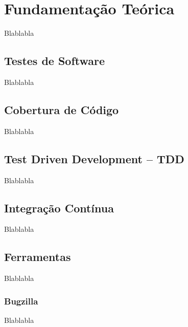 \documentclass[11.5pt]{article}
\begin{document}


\section{Fundamentação Teórica}
Blablabla


\subsection{Testes de Software}
Blablabla


\subsection{Cobertura de Código}
Blablabla


\subsection{Test Driven Development -- TDD}
Blablabla


\subsection{Integração Contínua}
Blablabla


\subsection{Ferramentas}
Blablabla

\subsubsection{Bugzilla}
Blablabla
\end{document}
